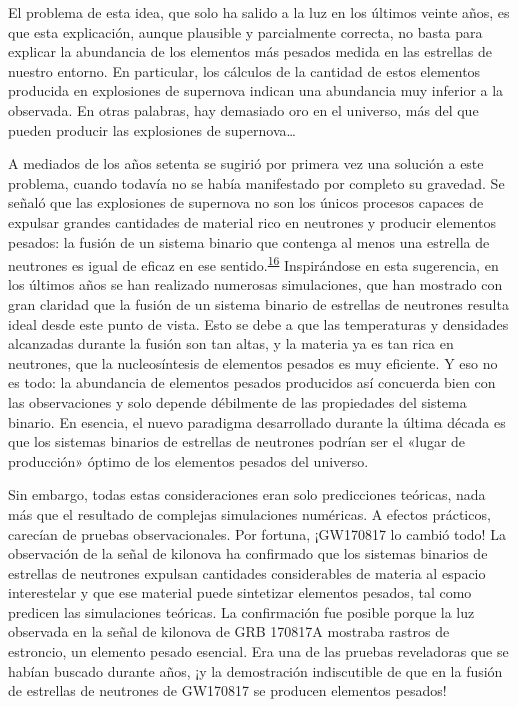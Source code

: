 El problema de esta idea, que solo ha salido a la luz en los últimos veinte años, es que esta explicación, aunque plausible y parcialmente correcta, no basta para explicar la abundancia de los elementos más pesados medida en las estrellas de nuestro entorno. En particular, los cálculos de la cantidad de estos elementos producida en explosiones de supernova indican una abundancia muy inferior a la observada. En otras palabras, hay demasiado oro en el universo, más del que pueden producir las explosiones de supernova\ldots{}

A mediados de los años setenta se sugirió por primera vez una solución a este problema, cuando todavía no se había manifestado por completo su gravedad. Se señaló que las explosiones de supernova no son los únicos procesos capaces de expulsar grandes cantidades de material rico en neutrones y producir elementos pesados: la fusión de un sistema binario que contenga al menos una estrella de neutrones es igual de eficaz en ese sentido.\textsuperscript{\hyperlink{note:08-16}{16}} Inspirándose en esta sugerencia, en los últimos años se han realizado numerosas simulaciones, que han mostrado con gran claridad que la fusión de un sistema binario de estrellas de neutrones resulta ideal desde este punto de vista. Esto se debe a que las temperaturas y densidades alcanzadas durante la fusión son tan altas, y la materia ya es tan rica en neutrones, que la nucleosíntesis de elementos pesados es muy eficiente. Y eso no es todo: la abundancia de elementos pesados producidos así concuerda bien con las observaciones y solo depende débilmente de las propiedades del sistema binario. En esencia, el nuevo paradigma desarrollado durante la última década es que los sistemas binarios de estrellas de neutrones podrían ser el «lugar de producción» óptimo de los elementos pesados del universo.

Sin embargo, todas estas consideraciones eran solo predicciones teóricas, nada más que el resultado de complejas simulaciones numéricas. A efectos prácticos, carecían de pruebas observacionales. Por fortuna, ¡GW170817 lo cambió todo! La observación de la señal de kilonova ha confirmado que los sistemas binarios de estrellas de neutrones expulsan cantidades considerables de materia al espacio interestelar y que ese material puede sintetizar elementos pesados, tal como predicen las simulaciones teóricas. La confirmación fue posible porque la luz observada en la señal de kilonova de GRB 170817A mostraba rastros de estroncio, un elemento pesado esencial. Era una de las pruebas reveladoras que se habían buscado durante años, ¡y la demostración indiscutible de que en la fusión de estrellas de neutrones de GW170817 se producen elementos pesados!

